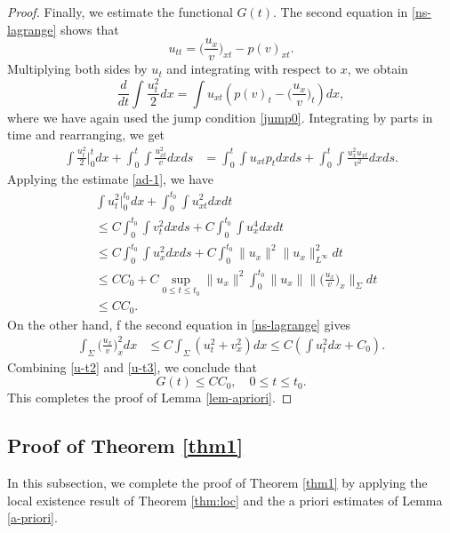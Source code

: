 \documentclass[a4paper,oneside,11pt]{article}
\numberwithin{equation}{section}
\begin{document}
\begin{proof}
Finally, we estimate the functional $G(t)$. The second equation in \eqref{ns-lagrange} shows that
$$u_{tt}=\big(\frac{u_{x}}{v}\big)_{xt}-p(v)_{xt}.$$
Multiplying both sides by $u_t$ and integrating with respect to $x$, we obtain
\[
\frac{d}{dt}\int \frac{u_t^2}{2} d x=\int u_{x t}\left(p(v)_t-\big(\frac{u_x}{v}\big)_t\right) d x,
\]
where we have again used the jump condition \eqref{jump0}. Integrating by parts in time and rearranging, we get
\begin{equation}\label{u-t1}
 \begin{aligned}
\int \frac{u_t^2}{2}\Big|_0^{t}d x+\int_0^t \int \frac{u_{xt}^2}{v} d x d s
&=\int_0^t \int u_{xt} p_t d x d s+\int_0^t \int \frac{u_x^2u_{xt}}{v^2} d x d s.
\end{aligned} 
\end{equation}
Applying the estimate \eqref{ad-1}, we have 
\begin{equation}\label{u-t2}
 \begin{aligned}
&\int u_t^2\Big|_0^{t_0}d x+\int_0^{t_0} \int u_{xt}^2 d x d t\\
&\leq C\int_0^{t_0} \int v_t^2 d x d s+C\int_0^{t_0} \int u_x^4 d x d t\\
&\leq C\int_0^{t_0} \int u_x^2 d x d s+C\int_0^{t_0}\|u_x\|^2\|u_x\|_{L^\infty}^2 d t\\
&\leq CC_0+C\sup_{0 \leq t \leq t_0}\|u_x\|^2\int_0^{t_0}\|u_x\|\|\big(\frac{u_x}{v}\big)_x\|_\Sigma d t\\
&\leq CC_0.
\end{aligned} 
\end{equation}
On the other hand, f the second equation in \eqref{ns-lagrange} gives
\begin{equation}\label{u-t3}
\begin{aligned}
\int_\Sigma\big(\frac{u_{x}}{v}\big)_{x}^2dx
&\leq C\int_\Sigma\left(u_t^2+v_x^2\right)dx\leq C(\int u_t^2dx+C_0).
\end{aligned}
\end{equation}
Combining \eqref{u-t2} and \eqref{u-t3}, we conclude that
\begin{equation}\label{ad-2}
  G(t)\leq CC_0,\quad 0\leq t\leq t_0.
\end{equation}
This completes the proof of Lemma \ref{lem-apriori}.
\end{proof}

\subsection{Proof of Theorem \ref{thm1}}
\indent\qquad
In this subsection, we complete the proof of Theorem \ref{thm1} by applying the local existence result of Theorem \ref{thm:loc} and the a priori estimates of Lemma \ref{a-priori}.\\
\end{document}
